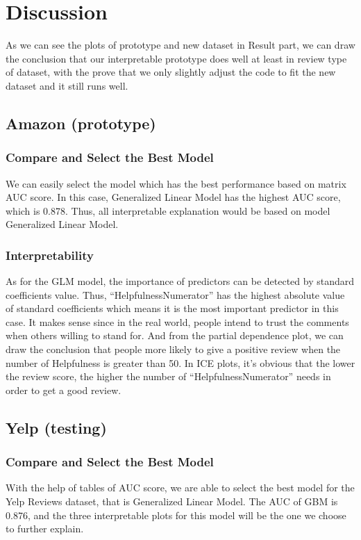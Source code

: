 \documentclass{article}
\begin{document}
\section{Discussion}
As we can see the plots of prototype and new dataset in Result part, we can draw the conclusion that our interpretable prototype does well at least in review type of dataset, with the prove that we only slightly adjust the code to fit the new dataset and it still runs well. 

\subsection{Amazon (prototype)}
\subsubsection{Compare and Select the Best Model}
We can easily select the model which has the best performance based on matrix AUC score. In this case, Generalized Linear Model has the highest AUC score, which is 0.878. Thus, all interpretable explanation would be based on model Generalized Linear Model.
\subsubsection{Interpretability}
As for the GLM model, the importance of predictors can be detected by standard coefficients value. Thus, “HelpfulnessNumerator” has the highest absolute value of standard coefficients which means it is the most important predictor in this case.
It makes sense since in the real world, people intend to trust the comments when others willing to stand for. And from the partial dependence plot, we can draw the conclusion that people more likely to give a positive review when the number of Helpfulness is greater than 50.
In ICE plots, it’s obvious that the lower the review score, the higher the number of “HelpfulnessNumerator” needs in order to get a good review.


\subsection{Yelp (testing)}
\subsubsection{Compare and Select the Best Model}
With the help of tables of AUC score, we are able to select the best model for the Yelp Reviews dataset, that is Generalized Linear Model. The AUC of GBM is 0.876, and the three interpretable plots for this model will be the one we choose to further explain. 
\end{document}
